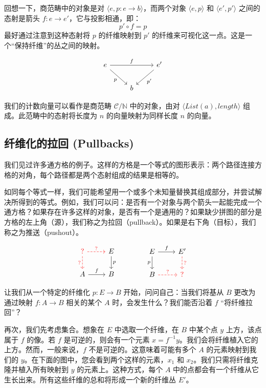 \documentclass[DaoFP]{subfiles}
\begin{document}
 回想一下，商范畴中的对象是对 $\langle e, p \colon e \to b \rangle$，而两个对象 $\langle e, p \rangle$ 和 $\langle e', p' \rangle$ 之间的态射是箭头 $f \colon e \to e'$，它与投影相通，即：
 \[p' \circ f = p \]
 最好通过注意到这种态射将 $p$ 的纤维映射到 $p'$ 的纤维来可视化这一点。这是一个“保持纤维”的丛之间的映射。

 \[
  \begin{tikzcd}
   e
   \arrow[rd, "p"']
   \arrow[rr, "f"]
   && e'
   \arrow[ld, "p'"]
   \\
   &b
  \end{tikzcd}
 \]

 我们的计数向量可以看作是商范畴 $\mathcal{C}/\mathbb{N}$ 中的对象，由对 $\langle \mathit{List}(a), \mathit{length} \rangle$ 组成。此范畴中的态射将长度为 $n$ 的向量映射为同样长度 $n$ 的向量。

 \subsection{纤维化的拉回 (Pullbacks)}

 我们见过许多通方格的例子。这样的方格是一个等式的图形表示：两个路径连接方格的对角，每个路径都是两个态射组成的结果是相等的。

 如同每个等式一样，我们可能希望用一个或多个未知量替换其组成部分，并尝试解决所得到的等式。例如，我们可以问：是否有一个对象与两个箭头一起能完成一个通方格？如果存在许多这样的对象，是否有一个是通用的？如果缺少拼图的部分是方格的左上角（源），我们称之为拉回（pullback）。如果是右下角（目标），我们称之为推送（pushout）。

 \[
  \begin{tikzcd}
   \color{red}?
   \arrow[d, red, dashed, "?"']
   \arrow[r, red, dashed, "?"]
   & E
   \arrow[d, "p"]
   \\
   A
   \arrow[r, "f"]
   &B
  \end{tikzcd}
  \hspace{40pt}
  \begin{tikzcd}
   E
   \arrow[d, "p"']
   \arrow[r, "f"]
   & E'
   \arrow[d, red, dashed, "?"]
   \\
   B
   \arrow[r, red, dashed, "?"]
   &\color{red}?
  \end{tikzcd}
 \]

 让我们从一个特定的纤维化 $p \colon E \to B$ 开始，问问自己：当我们将基从 $B$ 更改为通过映射 $f \colon A \to B$ 相关的某个 $A$ 时，会发生什么？我们能否沿着 $f$ “将纤维拉回”？

 再次，我们先考虑集合。想象在 $E$ 中选取一个纤维，在 $B$ 中某个点 $y$ 上方，该点属于 $f$ 的像。若 $f$ 是可逆的，则会有一个元素 $x = f^{-1} y$。我们会将纤维植入它的上方。然而，一般来说，$f$ 不是可逆的。这意味着可能有多个 $A$ 的元素映射到我们的 $y$。在下面的图中，您会看到两个这样的元素，$x_1$ 和 $x_2$。我们只需将纤维克隆并植入所有映射到 $y$ 的元素上。这种方式，每个 $A$ 中的点都会有一个纤维从它生长出来。所有这些纤维的总和将形成一个新的纤维丛 $E'$。
\end{document}
